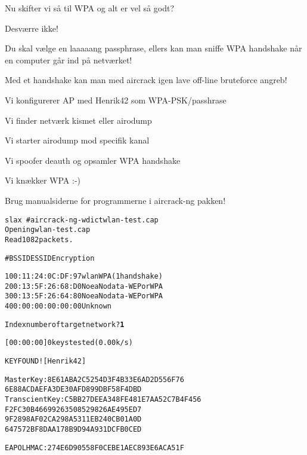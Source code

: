 \documentclass[Screen16to9,17pt]{foils}
\begin{document}

\begin{list1}
\item Nu skifter vi så til WPA og alt er vel så godt?
\pause
\item Desværre ikke!
\item Du skal vælge en laaaaang passphrase, ellers kan man sniffe WPA
  handshake når en computer går ind på netværket!
\item Med et handshake kan man med aircrack igen lave off-line
  bruteforce angreb!
\end{list1}


\begin{list1}
\item Vi konfigurerer AP med Henrik42 som WPA-PSK/passhrase
\item Vi finder netværk kismet eller airodump
\item Vi starter airodump mod specifik kanal
\item Vi spoofer deauth og opsamler WPA handshake
\item Vi knækker WPA :-)
\end{list1}

\centerline{Brug manualsiderne for programmerne i aircrack-ng pakken!}


\begin{alltt}
\small
slax ~ # aircrack-ng -w dict wlan-test.cap
Opening wlan-test.cap
Read 1082 packets.

#  BSSID              ESSID           Encryption

1  00:11:24:0C:DF:97  wlan            WPA (1 handshake)
2  00:13:5F:26:68:D0  Noea            No data - WEP or WPA
3  00:13:5F:26:64:80  Noea            No data - WEP or WPA
4  00:00:00:00:00:00                  Unknown

Index number of target network ? {\bf 1}
\end{alltt}


\begin{alltt}
\small
          [00:00:00] 0 keys tested (0.00 k/s)

                    KEY FOUND! [ Henrik42 ]

Master Key     : 8E 61 AB A2 C5 25 4D 3F 4B 33 E6 AD 2D 55 6F 76
                 6E 88 AC DA EF A3 DE 30 AF D8 99 DB F5 8F 4D BD
Transcient Key : C5 BB 27 DE EA 34 8F E4 81 E7 AA 52 C7 B4 F4 56
                 F2 FC 30 B4 66 99 26 35 08 52 98 26 AE 49 5E D7
                 9F 28 98 AF 02 CA 29 8A 53 11 EB 24 0C B0 1A 0D
                 64 75 72 BF 8D AA 17 8B 9D 94 A9 31 DC FB 0C ED

EAPOL HMAC     : 27 4E 6D 90 55 8F 0C EB E1 AE C8 93 E6 AC A5 1F

\end{alltt}
\end{document}
